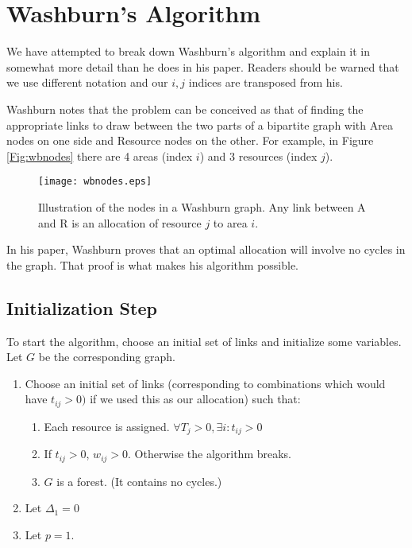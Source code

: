 \section{Washburn's Algorithm}

We have attempted to break down Washburn's algorithm and explain it in
somewhat more detail than he does in his paper. Readers should be
warned that we use different notation and our $i,j$ indices are
transposed from his.

Washburn notes that the problem can be conceived as that of finding
the appropriate links to draw between the two parts of a bipartite
graph with Area nodes on one side and Resource nodes on the other. For
example, in Figure \ref{Fig:wbnodes} there are 4 areas (index $i$) and
3 resources (index $j$).
\begin{figure}[htbp]
  \begin{center}
    \texttt{[image: wbnodes.eps]}
    \caption{Illustration of the nodes in a Washburn graph. Any link between A and R is an allocation of resource $j$ to area $i$.}
    \label{fig:wbnodes}
  \end{center}
\end{figure}
In his paper, Washburn proves that an optimal allocation will involve
no cycles in the graph. That proof is what makes his algorithm
possible.


\subsection{Initialization Step}
\label{sec:init}
To start the algorithm, choose an initial set of links and initialize
some variables. Let $G$ be the corresponding graph.
\begin{enumerate}
\item Choose an initial set of links (corresponding to combinations
  which would have $t_{ij} > 0)$ if we used this as our allocation) such that:
  \begin{enumerate}
  \item Each resource is assigned. $\forall T_j > 0, \exists i :
    t_{ij} > 0$
  \item If $t_{ij} > 0$, $w_{ij} > 0$. Otherwise the algorithm breaks.
  \item $G$ is a forest. (It contains no cycles.)
  \end{enumerate}
\item Let $\Delta_1 = 0$  
\item Let $p = 1$. 
\end{enumerate}

